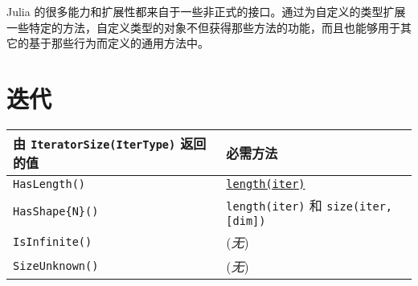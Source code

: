 Julia 的很多能力和扩展性都来自于一些非正式的接口。通过为自定义的类型扩展一些特定的方法，自定义类型的对象不但获得那些方法的功能，而且也能够用于其它的基于那些行为而定义的通用方法中。



\hypertarget{5510379658285713272}{}


\section{迭代}










\begin{table}[h]

\begin{tabulary}{\linewidth}{|L|L|}
\hline
由 \texttt{IteratorSize(IterType)} 返回的值 & 必需方法 \\
\hline
\texttt{HasLength()} & \hyperlink{3699181304419743826}{\texttt{length(iter)}} \\
\hline
\texttt{HasShape\{N\}()} & \texttt{length(iter)} 和 \texttt{size(iter, [dim])} \\
\hline
\texttt{IsInfinite()} & (\emph{无}) \\
\hline
\texttt{SizeUnknown()} & (\emph{无}) \\
\hline
\end{tabulary}

\end{table}




